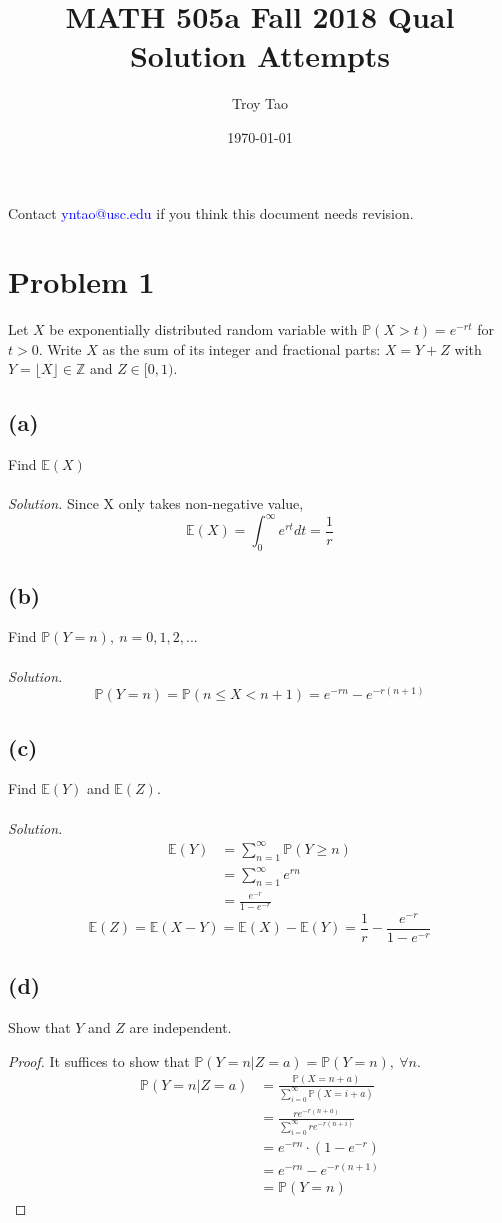 \documentclass{article}
\title{MATH 505a Fall 2018 Qual Solution Attempts}
\author{Troy Tao}
\date\today
\newcommand{\prob}{\mathbb{P}}
\newcommand{\E}{\mathbb{E}}
\begin{document}
\maketitle 
Contact \textcolor{blue}{yntao@usc.edu} if you think this document needs revision.


\section*{Problem 1}
Let $X$ be exponentially distributed random variable with $\prob(X>t)=e^{-rt}$ for $t>0$. Write $X$ as the sum of its integer and fractional parts: $X=Y+Z$ with $Y=\lfloor X \rfloor \in \mathbb{Z}$ and $Z \in [0,1)$.
\subsection*{(a)}
Find $\E(X)$
\color{blue}
\\\\\textit{Solution. }Since X only takes non-negative value,
$$\E(X) = \int_0^\infty e^{rt}dt = \frac{1}{r}$$
\color{black}
\subsection*{(b)}
Find $\prob(Y=n),\ n=0,1,2,...$
\color{blue}
\\\\\textit{Solution. }
$$\prob(Y=n) = \prob(n\leq X <n+1) = e^{-rn}-e^{-r(n+1)}$$
\color{black}
\subsection*{(c)}
Find $\E(Y)$ and $\E(Z)$.
\color{blue}
\\\\\textit{Solution. }
\begin{equation*}
    \begin{split}
        \E(Y) &= \sum_{n=1}^\infty\prob(Y\geq n)\\
        &= \sum_{n=1}^\infty e^{rn}\\
        &= \frac{e^{-r}}{1-e^{-r}}
    \end{split}
\end{equation*}
$$\E(Z) = \E(X-Y) = \E(X)-\E(Y)=\frac{1}{r}-\frac{e^{-r}}{1-e^{-r}}$$
\color{black}
\subsection*{(d)}
Show that $Y$ and $Z$ are independent.
\color{blue}
\begin{proof}
It suffices to show that $\prob(Y=n \vert Z=a) = \prob(Y=n),\  \forall n $. 
\begin{equation*}
    \begin{split}
        \prob(Y=n \vert Z=a) &= \frac{\prob(X=n+a)}{\sum_{i=0}^\infty\prob(X=i+a)}\\
        &= \frac{re^{-r(n+a)}}{\sum_{i=0}^\infty re^{-r(n+i)}}\\
        &= e^{-rn}\cdot (1-e^{-r})\\
        &= e^{-rn}-e^{-r(n+1)}\\
        &= \prob(Y=n)
    \end{split}
\end{equation*}
\end{proof}
\color{black}
\end{document}
